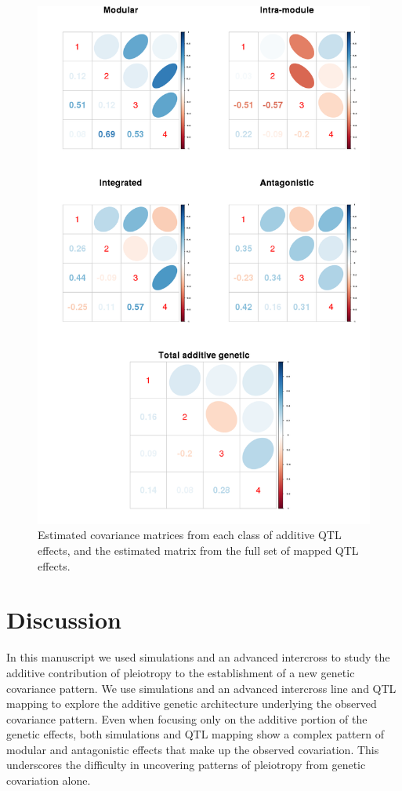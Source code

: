 \begin{refsection}
\begin{figure}
    \centering
    \includegraphics[width=\linewidth]{chapter_atchley/media/additive_matrices_by_class.png}
    \caption[Covariance matrices by effect class]{Estimated covariance matrices from each class of additive QTL effects, and the estimated matrix from the full set of mapped QTL effects. }
    \label{additive_effects_matrices}
\end{figure}


\section{Discussion}

In this manuscript we used simulations and an advanced intercross to study the
additive contribution of pleiotropy to the establishment of a new genetic
covariance pattern. We use simulations and an advanced intercross line and QTL
mapping to explore the additive genetic architecture underlying the observed
covariance pattern. Even when focusing only on the additive portion of the
genetic effects, both simulations and QTL mapping show a complex pattern of
modular and antagonistic effects that make up the observed covariation. This
underscores the difficulty in uncovering patterns of pleiotropy from genetic
covariation alone.


\end{refsection}
